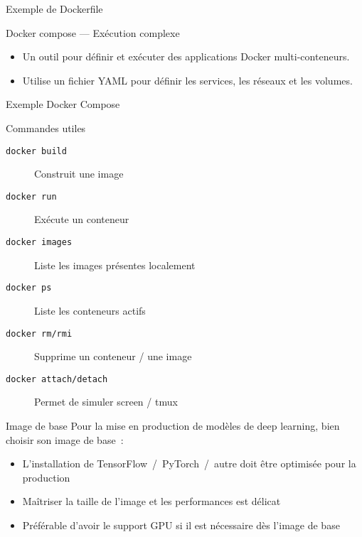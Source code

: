 \begin{frame}{Exemple de Dockerfile}
\end{frame}

\begin{frame}{Docker compose — Exécution complexe}
  \begin{itemize}
    \item Un outil pour définir et exécuter des applications Docker multi-conteneurs.
    \item Utilise un fichier YAML pour définir les services, les réseaux et les volumes.
  \end{itemize}
\end{frame}

\begin{frame}{Exemple Docker Compose}
\end{frame}

\begin{frame}{Commandes utiles}
  \begin{description}
    \item[\texttt{docker build}] Construit une image
    \item[\texttt{docker run}] Exécute un conteneur
    \item[\texttt{docker images}] Liste les images présentes localement
    \item[\texttt{docker ps}] Liste les conteneurs actifs
    \item[\texttt{docker rm/rmi}] Supprime un conteneur / une image
    \item[\texttt{docker attach/detach}] Permet de simuler screen / tmux
  \end{description}
\end{frame}

\begin{frame}{Image de base}
  Pour la mise en production de modèles de deep learning, bien choisir son image de base~:

  \begin{itemize}
    \item L'installation de TensorFlow~/~PyTorch~/~autre doit être optimisée pour la production
    \item Maîtriser la taille de l'image et les performances est délicat
    \item Préférable d'avoir le support GPU si il est nécessaire dès l'image de base
  \end{itemize}
\end{frame}

